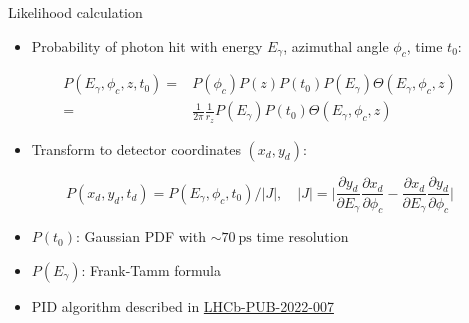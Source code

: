 \documentclass{beamer}
\begin{document}
\begin{frame}{Likelihood calculation}
  \begin{itemize}
    \item{Probability of photon hit with energy $E_\gamma$, azimuthal angle $\phi_c$, time $t_0$:}
  \end{itemize}
  \begin{align*}
    P(E_\gamma, \phi_c, z, t_0) =& P(\phi_c)P(z)P(t_0)P(E_\gamma)\Theta(E_\gamma, \phi_c, z) \\
    =& \frac{1}{2\pi}\frac{1}{r_z}P(E_\gamma)P(t_0)\Theta(E_\gamma, \phi_c, z)
  \end{align*}
  \begin{itemize}
    \item{Transform to detector coordinates $(x_d, y_d)$:}
  \end{itemize}
  \begin{equation*}
    P(x_d, y_d, t_d) = P(E_\gamma, \phi_c, t_0)/\lvert J\rvert, \quad \lvert J\rvert = \Big\lvert\frac{\partial y_d}{\partial E_\gamma}\frac{\partial x_d}{\partial\phi_c} - \frac{\partial x_d}{\partial E_\gamma}\frac{\partial y_d}{\partial\phi_c}\Big\rvert
  \end{equation*}
  \begin{itemize}
    \item{$P(t_0)$: Gaussian PDF with $\sim\SI{70}{\pico\second}$ time resolution}
    \item{$P(E_\gamma)$: Frank-Tamm formula}
  \end{itemize}
  \begin{itemize}
    \item{PID algorithm described in \href{https://www.overleaf.com/project/5d0b9c5a5005405666aacd05}{LHCb-PUB-2022-007}}
  \end{itemize}
\end{frame}
\end{document}
